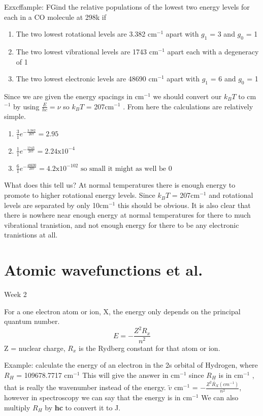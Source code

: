 \documentclass{article}
\newcommand{\thedate}[1]{\hfill{\small\sc #1}}
\newcommand{\cm}{cm\(^{-1}\) }
\begin{document}
    Ezxcffample: FGind the relative populations of the lowest two energy levels for each in a CO molecule at 298k if
    \begin{enumerate}
        \item The two lowest rotational levels are 3.382 cm$^{-1}$ apart with $g_1$ = 3 and $g_0$ = 1
        \item The two lowest vibrational levels are 1743 cm$^{-1}$ apart each with a degeneracy of 1
        \item The two lowest electronic levels are 48690 cm$^{-1}$ apart with $g_1$ = 6 and $g_0$ = 1
    \end{enumerate}

    Since we are given the energy spacings in cm\(^{-1}\) we should convert our $k_BT$ to cm$^{-1}$ by using
    \(\frac{E}{hc} = \nu\) so $k_BT$ = 207\cm. From here the calculations are relatively simple.
    \begin{enumerate}
        \item \(\frac{3}{1}e^{-\frac{3.382}{207}} = 2.95\)
        \item \(\frac{1}{1}e^{-\frac{1743}{207}} = 2.24\text{x}10^{-4}\)
        \item \(\frac{6}{1}e^{-\frac{48690}{207}} = 4.2\text{x}10^{-102} \text{ so small it might as well be 0}\)
    \end{enumerate}

    What does this tell us? At normal temperatures there is enough energy to promote to higher rotational 
    energy levels. Since $k_BT$ = 207\cm and rotational levels are separated by only 10\cm this should be obvious.
    It is also clear that there is nowhere near enough energy at normal temperatures for there to much vibrational
    tranistion, and not enough energy for there to be any electronic tranistions at all.

    \section{Atomic wavefunctions et al.}\thedate{Week 2}

    For a one electron atom or ion, X, the energy only depends on the principal quantum number. $$E = -\frac{Z^2R_x}{n^2}$$ Z = nuclear charge, $R_x$ is the Rydberg constant for that atom or ion.

    Example: calculate the energy of an electron in the 2s orbital of Hydrogen, where $R_H$ = 109678.7717 cm$^{-1}$
    This will give the answer in cm$^{-1}$ since $R_H$ is in \cm, that is really the wavenumber instead of the energy.
    $\tilde{v}$ \cm = $-\frac{Z^2\tilde{R_X}(cm^{-1})}{n^2}$, however in spectroscopy we can say that the energy is in \cm
    We can also multiply $R_H$ by \textbf{hc} to convert it to J.
    
\end{document}
